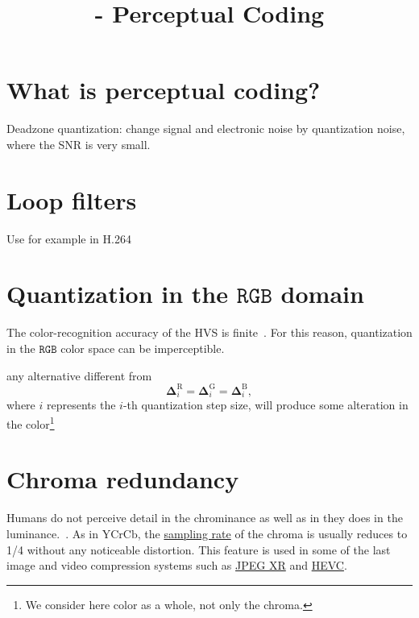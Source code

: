 


\title{\SM{} - Perceptual Coding}

\maketitle

\tableofcontents

\section{What is perceptual coding?}

Deadzone quantization: change signal and electronic noise by
quantization noise, where the SNR is very small.

\section{Loop filters}
Use for example in H.264

\section{Quantization in the $\texttt{RGB}$ domain}

The color-recognition accuracy of the HVS is
finite~\cite{vruiz__visual_redundancy}. For this reason, quantization
in the $\texttt{RGB}$ color space can be imperceptible.

any alternative different from
\begin{equation}
  \mathbf{\Delta}^{\text{R}}_i = \mathbf{\Delta}^{\text{G}}_i =
  \mathbf{\Delta}^{\text{B}}_i,
  \label{eq:simple_Q}
\end{equation}
where $i$ represents the $i$-th quantization step size, will produce
some alteration in the color\footnote{We consider here color as a
whole, not only the chroma.}

\section{Chroma redundancy}

Humans do not perceive detail in the chrominance as well as in they
does in the
luminance.~\cite{burger2016digital}. As in
$\text{YCrCb}$, the
\href{https://en.wikipedia.org/wiki/Sampling_(signal_processing)}{sampling
  rate} of the chroma is usually reduces to 1/4 without any noticeable
distortion. This feature is used in some of the last image and video
compression systems such as
\href{https://en.wikipedia.org/wiki/JPEG_XR#Description}{JPEG XR} and
\href{https://en.wikipedia.org/wiki/High_Efficiency_Video_Coding#Video_coding_layer}{HEVC}.

